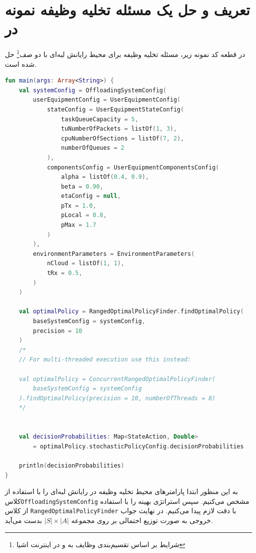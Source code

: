 \section{تعریف و حل یک مسئله تخلیه وظیفه نمونه در }
در قطعه کد نمونه زیر، مسئله تخلیه وظیفه‌ برای محیط رایانش لبه‌ای با دو صف\footnote{شرایط بر اساس تقسیم‌بندی وظایف به  و  در اینترنت اشیا} حل شده است.
\begin{LTR}
	\begin{lstlisting}[language=Kotlin, caption={تعریف و حل مسئله نمونه}, captiondirection=RTL, label={lst:solve}]
fun main(args: Array<String>) {
	val systemConfig = OffloadingSystemConfig(
		userEquipmentConfig = UserEquipmentConfig(
			stateConfig = UserEquipmentStateConfig(
				taskQueueCapacity = 5,
				tuNumberOfPackets = listOf(1, 3),
				cpuNumberOfSections = listOf(7, 2),
				numberOfQueues = 2
			),
			componentsConfig = UserEquipmentComponentsConfig(
				alpha = listOf(0.4, 0.9),
				beta = 0.90,
				etaConfig = null,
				pTx = 1.0,
				pLocal = 0.8,
				pMax = 1.7
			)
		),
		environmentParameters = EnvironmentParameters(
			nCloud = listOf(1, 1),
			tRx = 0.5,
		)
	)
	
	val optimalPolicy = RangedOptimalPolicyFinder.findOptimalPolicy(
		baseSystemConfig = systemConfig, 
		precision = 10
	)
	/*
	// For multi-threaded execution use this instead:
	
	val optimalPolicy = ConcurrentRangedOptimalPolicyFinder(
		baseSystemConfig = systemConfig
	).findOptimalPolicy(precision = 10, numberOfThreads = 8)
	*/
	
	
	val decisionProbabilities: Map<StateAction, Double>
		= optimalPolicy.stochasticPolicyConfig.decisionProbabilities
	
	println(decisionProbabilities)
}
	\end{lstlisting}
\end{LTR}
به این منظور ابتدا پارامترهای محیط تخلیه وظیفه در رایانش لبه‌ای را با استفاده از کلاس\linebreak \texttt{\footnotesize OffloadingSystemConfig} مشخص می‌کنیم. سپس استراتژی بهینه را با استفاده از کلاس \texttt{\footnotesize RangedOptimalPolicyFinder} با دقت لازم پیدا می‌کنیم. در نهایت جواب خروجی به صورت توزیع احتمالی بر روی مجموعه $|S| \times |A|$ بدست می‌آید.
\newpage
